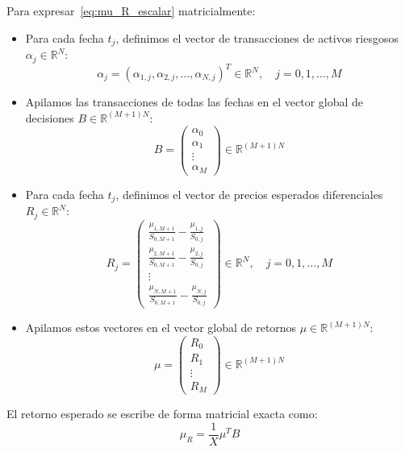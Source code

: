 \documentclass[11pt,a4paper]{report}
\numberwithin{equation}{chapter}
\begin{document}
Para expresar~\eqref{eq:mu_R_escalar} matricialmente:
\begin{itemize}[leftmargin=2em]
    \item Para cada fecha $t_j$, definimos el vector de transacciones de activos riesgosos $\alpha_j \in \mathbb{R}^N$:
    \begin{equation}
        \alpha_j = (\alpha_{1,j}, \alpha_{2,j}, \dots, \alpha_{N,j})^T \in \mathbb{R}^N, \quad j = 0, 1, \dots, M
    \end{equation}
    \item Apilamos las transacciones de todas las fechas en el vector global de decisiones $B \in \mathbb{R}^{(M+1)N}$:
    \begin{equation}
        B = \begin{pmatrix} \alpha_0 \\ \alpha_1 \\ \vdots \\ \alpha_M \end{pmatrix} \in \mathbb{R}^{(M+1)N}
    \end{equation}
    \item Para cada fecha $t_j$, definimos el vector de precios esperados diferenciales $R_j \in \mathbb{R}^N$:
    \begin{equation}
        R_j = \begin{pmatrix}
            \frac{\mu_{1,M+1}}{S_{0,M+1}} - \frac{\mu_{1,j}}{S_{0,j}} \\
            \frac{\mu_{2,M+1}}{S_{0,M+1}} - \frac{\mu_{2,j}}{S_{0,j}} \\
            \vdots \\
            \frac{\mu_{N,M+1}}{S_{0,M+1}} - \frac{\mu_{N,j}}{S_{0,j}}
        \end{pmatrix} \in \mathbb{R}^N, \quad j = 0, 1, \dots, M
    \end{equation}
    \item Apilamos estos vectores en el vector global de retornos $\mu \in \mathbb{R}^{(M+1)N}$:
    \begin{equation}
        \mu = \begin{pmatrix} R_0 \\ R_1 \\ \vdots \\ R_M \end{pmatrix} \in \mathbb{R}^{(M+1)N}
    \end{equation}
\end{itemize}

El retorno esperado se escribe de forma matricial exacta como:
\begin{equation}
    \boxed{\mu_R = \frac{1}{X} \mu^T B} \label{eq:mu_R_matricial}
\end{equation}
\end{document}
